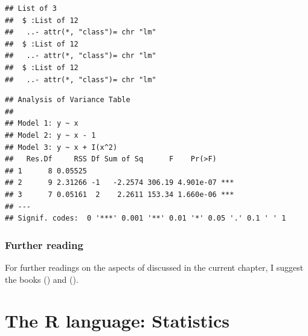\documentclass[krantz2]{krantz}\usepackage{knitr}
\begin{document}
\begin{knitrout}\footnotesize
{}\color{fgcolor}\begin{kframe}
\begin{alltt}
 \hlkwb{<-} \hlstd{()}
 \hlkwb{<-}  \hlopt{~}  \hlopt{~}  \hlopt{-}  \hlopt{~}  \hlopt{+} \hlopt{^}\hlstd{))}
   \hlstd{(} 
    \hlkwb{<-}   
   \hlstd{\}}
  \hlstd{=} \hlstd{)}
\end{alltt}
\begin{verbatim}
## List of 3
##  $ :List of 12
##   ..- attr(*, "class")= chr "lm"
##  $ :List of 12
##   ..- attr(*, "class")= chr "lm"
##  $ :List of 12
##   ..- attr(*, "class")= chr "lm"
\end{verbatim}
\begin{alltt}
\end{alltt}
\begin{verbatim}
## Analysis of Variance Table
##
## Model 1: y ~ x
## Model 2: y ~ x - 1
## Model 3: y ~ x + I(x^2)
##   Res.Df     RSS Df Sum of Sq      F    Pr(>F)
## 1      8 0.05525
## 2      9 2.31266 -1   -2.2574 306.19 4.901e-07 ***
## 3      7 0.05161  2    2.2611 153.34 1.660e-06 ***
## ---
## Signif. codes:  0 '***' 0.001 '**' 0.01 '*' 0.05 '.' 0.1 ' ' 1
\end{verbatim}
\end{kframe}
\end{knitrout}

\subsection{Further reading}
For further readings on the aspects of \Rlang discussed in the current chapter, I suggest the books  (\citeauthor{Matloff2011}) and  (\citeauthor{Wickham2019}).




\chapter{The R language: Statistics}\label{chap:R:statistics}
\end{document}
